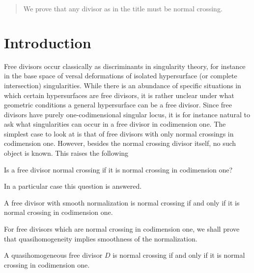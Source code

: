 
\begin{abstract}
We prove that any divisor as in the title must be normal crossing.
\end{abstract}

\maketitle
\tableofcontents

\section*{Introduction}

Free divisors occur classically as discriminants in singularity theory, for instance in the base space of versal deformations of isolated hypersurface (or complete intersection) singularities.
While there is an abundance of specific situations in which certain hypersurfaces are free divisors, it is rather unclear under what geometric conditions a general hypersurface can be a free divisor.
Since free divisors have purely one-codimensional singular locus, it is for instance natural to ask what singularities can occur in a free divisor in codimension one.
The simplest case to look at is that of free divisors with only normal crossings in codimension one.
However, besides the normal crossing divisor itself, no such object is known.
This raises the following

\begin{que}\label{41}
Is a free divisor normal crossing if it is normal crossing in codimension one?
\end{que}

In a particular case this question is answered.

\begin{thm}\label{39}
A free divisor with smooth normalization is normal crossing if and only if it is normal crossing in codimension one.
\end{thm}

For free divisors which are normal crossing in codimension one, we shall prove that quasihomogeneity implies smoothness of the normalization.

\begin{thm}\label{0}
A quasihomogeneous free divisor $D$ is normal crossing if and only if it is normal crossing in codimension one.
\end{thm}

